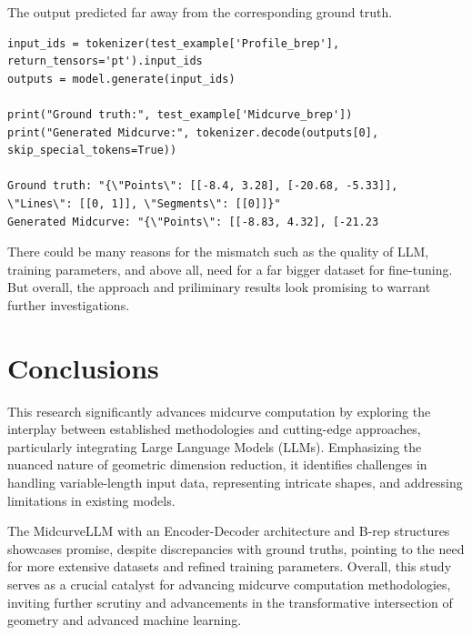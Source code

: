 \documentclass[10pt, conference]{IEEEtran}
\begin{document}
%    
    
The output predicted far away from the corresponding ground truth. 

\begin{lstlisting}[basicstyle=\tiny, breaklines=true, breakatwhitespace=true,label=lst:python]
input_ids = tokenizer(test_example['Profile_brep'], return_tensors='pt').input_ids
outputs = model.generate(input_ids)

print("Ground truth:", test_example['Midcurve_brep'])
print("Generated Midcurve:", tokenizer.decode(outputs[0], skip_special_tokens=True))

Ground truth: "{\"Points\": [[-8.4, 3.28], [-20.68, -5.33]], \"Lines\": [[0, 1]], \"Segments\": [[0]]}"
Generated Midcurve: "{\"Points\": [[-8.83, 4.32], [-21.23
\end{lstlisting}

    
There could be many reasons for the mismatch such as the quality of LLM, training parameters, and above all, need for a far bigger dataset for fine-tuning. But overall, the approach and priliminary results look promising to warrant further investigations.


\section{Conclusions}
\label{sec:5}

This research significantly advances midcurve computation by exploring the interplay between established methodologies and cutting-edge approaches, particularly integrating Large Language Models (LLMs). Emphasizing the nuanced nature of geometric dimension reduction, it identifies challenges in handling variable-length input data, representing intricate shapes, and addressing limitations in existing models.

 The MidcurveLLM with an Encoder-Decoder architecture and B-rep structures showcases promise, despite discrepancies with ground truths, pointing to the need for more extensive datasets and refined training parameters. Overall, this study serves as a crucial catalyst for advancing midcurve computation methodologies, inviting further scrutiny and advancements in the transformative intersection of geometry and advanced machine learning.
\end{document}
